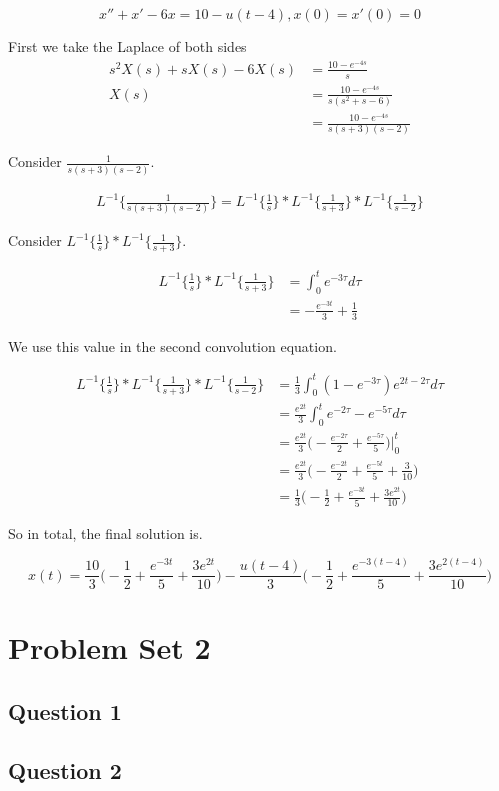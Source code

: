 \documentclass[titlepage]{article}
\begin{document}
$$x'' + x' - 6x = 10 - u(t - 4), x(0) = x'(0) = 0$$

First we take the Laplace of both sides
\begin{align*}
    s^2X(s) + sX(s) - 6X(s) &= \frac{10 - e^{-4s}}{s}
    \\ X(s) &= \frac{10 - e^{-4s}}{s(s^2 + s - 6)}
    \\ &= \frac{10 - e^{-4s}}{s(s+3)(s-2)}
\end{align*}

Consider $\frac{1}{s(s+3)(s-2)}$.

\begin{align*}
    L^{-1}\{\frac{1}{s(s+3)(s-2)}\} = L^{-1}\{\frac{1}{s}\} * L^{-1}\{\frac{1}{s+3}\} * L^{-1}\{\frac{1}{s-2}\}
\end{align*}

Consider $L^{-1}\{\frac{1}{s}\} * L^{-1}\{\frac{1}{s+3}\}$.

\begin{align*}
    L^{-1}\{\frac{1}{s}\} * L^{-1}\{\frac{1}{s+3}\} &= \int_0^t e^{-3\tau} d\tau
    \\ &= -\frac{e^{-3t}}{3} + \frac{1}{3}
\end{align*}

We use this value in the second convolution equation.

\begin{align*}
    L^{-1}\{\frac{1}{s}\} * L^{-1}\{\frac{1}{s+3}\} * L^{-1}\{\frac{1}{s-2}\}
    &= \frac{1}{3}\int_0^t (1 - e^{-3\tau})e^{2t - 2\tau} d\tau
    \\ &= \frac{e^{2t}}{3}\int_0^t e^{-2\tau} - e^{-5\tau} d\tau
    \\ &= \frac{e^{2t}}{3} \bigg(-\frac{e^{-2\tau}}{2} + \frac{e^{-5\tau}}{5}\bigg) \bigg|_0^t
    \\ &= \frac{e^{2t}}{3} \bigg(-\frac{e^{-2t}}{2} + \frac{e^{-5t}}{5} + \frac{3}{10}\bigg)
    \\ &= \frac{1}{3} \bigg(-\frac{1}{2} + \frac{e^{-3t}}{5} + \frac{3e^{2t}}{10}\bigg)
\end{align*}

So in total, the final solution is.

$$x(t) = \frac{10}{3}\bigg(-\frac{1}{2} + \frac{e^{-3t}}{5} + \frac{3e^{2t}}{10}\bigg) - \frac{u(t - 4)}{3}\bigg(-\frac{1}{2} + \frac{e^{-3(t - 4)}}{5} + \frac{3e^{2(t - 4)}}{10}\bigg)$$

\section*{Problem Set 2}
\subsection*{Question 1}
\subsection*{Question 2}
\end{document}
